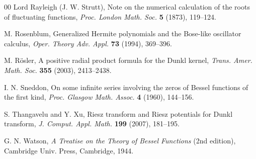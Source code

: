 \documentclass[10pt,a4paper]{article}
\theoremstyle{plain}
\theoremstyle{definition}
\numberwithin{equation}{section} %
\begin{document}
\begin{thebibliography}{00}
Lord Rayleigh (J. W. Strutt),
{Note on the numerical calculation of the roots of fluctuating functions},
\textit{Proc. London Math. Soc.}
\textbf{5} (1873), 119--124.

M. Rosenblum,
{Generalized Hermite polynomials and the Bose-like oscillator calculus},
\textit{Oper. Theory Adv. Appl.}
\textbf{73} (1994), 369--396.

M. R\"osler,
A positive radial product formula for the Dunkl kernel,
\textit{Trans. Amer. Math. Soc.}
\textbf{355} (2003), 2413--2438.

I. N. Sneddon,
On some infinite series involving the zeros of Bessel functions of the first kind,
\textit{Proc. Glasgow Math. Assoc.}
\textbf{4} (1960), 144--156.

S. Thangavelu and Y. Xu,
Riesz transform and Riesz potentials for Dunkl transform,
\textit{J. Comput. Appl. Math.}
\textbf{199} (2007), 181--195.

G. N. Watson,
\textit{A Treatise on the Theory of Bessel Functions} (2nd edition),
Cambridge Univ. Press,
Cambridge, 1944.

\end{thebibliography}

\end{document}

